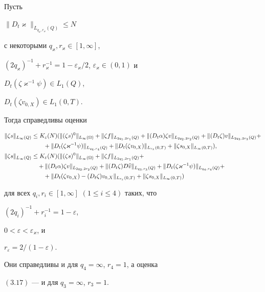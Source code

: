 \begin{props} Пусть


$\|D_t\varkappa\|_{L_{q_\varkappa,r_\varkappa}(Q)}\le N$


с некоторыми $q_\varkappa,r_\varkappa\in [1,\infty]$,


$(2q_\varkappa)^{-1}+r_{\varkappa}^{-1}=


1-\varepsilon_{\varkappa}/2$, $\varepsilon_{\varkappa}\in (0,1)$ и


$D_t(\zeta\varkappa^{-1}\psi)\in L_1(Q)$,


$D_t(\zeta v_{0,X})\in L_1(0,T)$.


Тогда справедливы оценки


\begin{align}


\|\zeta s\|_{L_\infty(Q)}&\le


K_\varepsilon(N)(\|(\zeta s)^0\|_{L_\infty(\Omega)}+


\|\zeta f\|_{L_{2q_1,2r_1}(Q)}+\|(D_t\alpha)\zeta


v\|_{L_{2q_2,2r_2}(Q)}+\|(D_t\zeta)v\|_{L_{2q_3,2r_3}(Q)}+ \notag\\


&\qquad+\|D_t(\zeta\varkappa^{-1}\psi)\|_{L_{q_4,r_4}(Q)}


+\|D_t(\zeta v_{0,X})\|_{L_{r_\varepsilon}(0,T)}+


\|\zeta s_{0,X}\|_{L_\infty (0,T)}),\\


%


\|\zeta s\|_{L_\infty(Q)}&\le


K_\varepsilon(N)(\|(\zeta s)^0\|_{L_\infty(\Omega)}


+\|\zeta f\|_{L_{2q_1,2r_1}(Q)}+\notag\\


&\quad+\|(D_t\alpha)\zeta v\|_{L_{2q_2,2r_2}(Q)}


+\|(D_t\zeta)D\widehat v\|_{L_{q_3,r_3}(Q)}


+\|D_t(\zeta\varkappa^{-1}\psi)\|_{L_{q_4,r_4}(Q)}+\notag\\


&\qquad+\|D_t(\zeta v_{0,X})-(D_t\zeta)v_{0,X}\|_{L_{r_\varepsilon}(0,T)}


+\|\zeta s_{0,X}\|_{L_\infty (0,T)})


\end{align}


для всех $q_i,r_i\in [1,\infty]$ $(1\le i\le 4)$ таких, что


$(2q_i)^{-1}+r_i^{-1}=1-\varepsilon$,


$0<\varepsilon<\varepsilon_{\varkappa}$, и


$r_{\varepsilon}=2/(1-\varepsilon)$.


Они справедливы и для $q_4=\infty$, $r_4=1$, а оценка


$(3.17)$ --- и для $q_3=\infty$, $r_3=1$.


\end{props}





